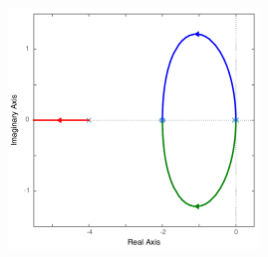 \documentclass[twoside]{article}
\begin{document}
\begin{enumerate}
\begin{center}
\begin{minipage}[h]{\linewidth}
    \begin{center}
      \includegraphics[width=0.5\textwidth]{rlocusA}
    \end{center}
\end{minipage}
\end{center}

\end{enumerate}

\end{document}
